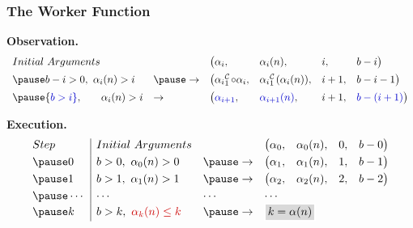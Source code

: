 \begin{frame}
\frametitle{The Worker Function}

\textbf{Observation.}
\begin{equation*}
\begin{array}{lllllll}
Initial \ Arguments & & \big(\alpha_i, & \alpha_i(n), & i, & b - i \big) \\[5pt]
\pause
b - i > 0, \ \alpha_i(n) > i & \pause \to & \big(\cdt{\alpha_i}{1}\circ \alpha_i, & \cdt{\alpha_i}{1}(\alpha_i(n)), & i + 1, & b - i - 1\big) \\[5pt]
\pause
{\color{blue} b > i}, \ \hspace{15pt} \alpha_i(n) > i & \to  & \big({\color{blue} \alpha_{i+1}}, & {\color{blue} \alpha_{i+1}(n)}, & i + 1, & {\color{blue} b - (i + 1)}\big) \\
\end{array}
\end{equation*}

\pause
\textbf{Execution.}
\begin{equation*}
\begin{array}{l|lllllll}
Step & Initial \ Arguments &  &  \big(\alpha_0, & \alpha_0(n), & 0, & b - 0 \big) \\[3pt]
\pause
0 & b > 0, \ \alpha_0(n) > 0 & \pause \to & \big(\alpha_1, & \alpha_1(n), & 1, & b - 1\big) \\[3pt]
\pause
1 & b > 1, \ \alpha_1(n) > 1 & \pause \to  & \big(\alpha_2, & \alpha_2(n), & 2, & b - 2\big) \\[3pt]
\pause
\cdots & \cdots & \cdots & \multicolumn{4}{l}{\cdots} \\
\pause
k & b > k, \ {\color{red} \alpha_{k}(n) \le k} & \pause \to  & \multicolumn{4}{l}{\impinline{$k = \alpha(n)$}}
\end{array}
\end{equation*}
\end{frame}



